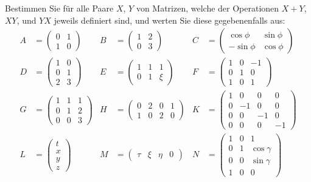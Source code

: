 \documentclass[11pt]{exam}
\begin{document}
\begin{questions}

Bestimmen Sie für alle Paare $X$, $Y$ von Matrizen, welche der Operationen $X+Y$, $XY$, und $YX$ jeweils definiert sind, und werten Sie diese gegebenenfalls aus:
\\
\begin{align*}
	A &= \left(\begin{array}{cc}0&1\\1&0\end{array}\right)
	&B &= \left(\begin{array}{cc}1&2\\0&3\end{array}\right)
	&C &= \left(\begin{array}{cc}\cos\phi&\sin\phi\\-\sin\phi&\cos\phi\end{array}\right)\\
	D &= \left(\begin{array}{cc}1&0\\0&1\\2&3\end{array}\right)
	&E &= \left(\begin{array}{ccc}1&1&1\\0&1&\xi\end{array}\right)
	&F &= \left(\begin{array}{ccc}1&0&-1\\0&1&0\\1&0&1\end{array}\right)\\
	G &= \left(\begin{array}{ccc}1&1&1\\0&1&2\\0&0&3\end{array}\right)
	&H &= \left(\begin{array}{cccc}0&2&0&1\\1&0&2&0\end{array}\right)
	&K &= \left(\begin{array}{cccc}1&0&0&0\\0&-1&0&0\\0&0&-1&0\\0&0&0&-1\end{array}\right)\\
	L &= \left(\begin{array}{c}t\\x\\y\\z\end{array}\right)
	&M &= \left(\begin{array}{cccc}\tau&\xi&\eta&0\end{array}\right)
	&N &= \left(\begin{array}{ccc}1&0&1\\0&1&\cos\gamma\\0&0&\sin\gamma\\1&0&0\end{array}\right)
\end{align*}


\end{questions}
\end{document}
